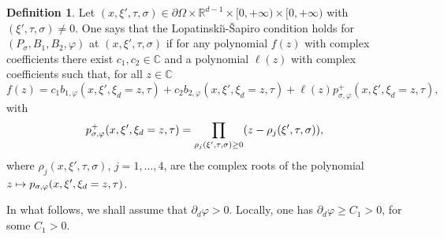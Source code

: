 \documentclass[10pt]{amsart}
\newcommand\mto{\mathchoice{\longmapsto}{\mapsto}{\mapsto}{\mapsto}}
\theoremstyle{plain}
\theoremstyle{definition}
\newtheorem{definition}[theorem]{Definition}
\def\R{\mathbb{R}}
\def\C{\mathbb{C}}
\newcommand{\LS}{Lopatinski\u{\i}-\v{S}apiro\xspace}
\let \Im \relax
\DeclareMathOperator{\Im}{Im}
\newcommand{\Psig}{P_{\sigma}}
\newcommand{\pconj}{p_{\sigma,\varphi}}
\begin{document}
\begin{definition}\label{def: LS after conjugation}
Let
$(x,\xi',\tau,\sigma)\in
\partial\Omega\times\R^{d-1}\times[0,+\infty) \times
[0,+\infty)$ with
$(\xi',\tau,\sigma)\neq0$. One says that the \LS condition holds for
$(\Psig ,B_1, B_2, \varphi)$ at $(x,\xi',\tau,\sigma)$ if for
any polynomial $f(z)$ with complex coefficients there
exist $c_1, c_2\in\C$ and a polynomial
$\ell(z)$ with complex coefficients such that, for all
$z\in\C$
\[
f(z)=c_1 b_{1,\varphi}(x,\xi',\xi_d=z,\tau)
+c_2b_{2,\varphi}(x,\xi',\xi_d=z,\tau)
+\ell(z) \pconj^+(x,\xi',\xi_d=z,\tau),
\]
with
\begin{equation*}
\pconj^+ (x,\xi',\xi_d=z,\tau)
=\prod_{\Im\rho_j(\xi',\tau,\sigma)\geq
0}(z-\rho_j(\xi',\tau,\sigma)),
\end{equation*}
where $\rho_j(x,\xi',\tau,\sigma)$, $j=1,\dots,4$, are the complex
roots of the polynomial $z\mto \pconj(x,\xi',\xi_d=z,\tau)$.
\end{definition}
In what follows, we shall assume that $\partial_d\varphi>0$.
Locally, one has $\partial_d\varphi\geq C_1>0$, for some $C_1>0$.
\end{document}
